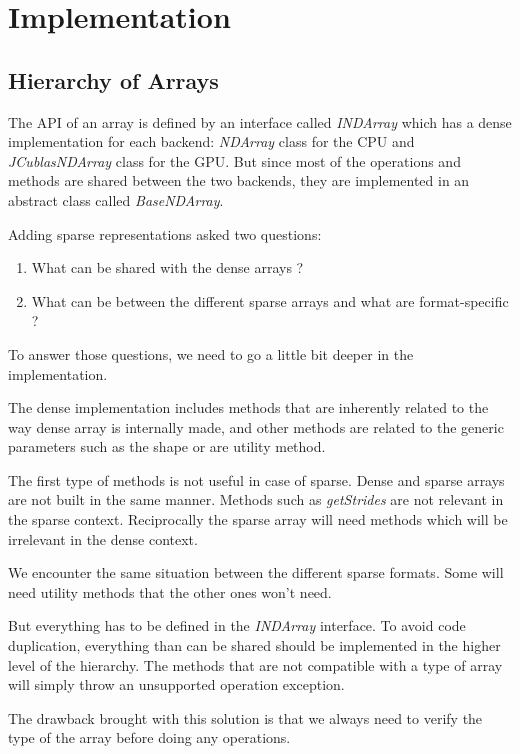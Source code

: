 \chapter{Implementation}


\section{Hierarchy of Arrays}

The API of an array is defined by an interface called \textit{INDArray} which has a dense implementation for each backend: \textit{NDArray} class for the CPU and \textit{JCublasNDArray} class for the GPU. But since most of the operations and methods are shared between the two backends, they are implemented in an abstract class called \textit{BaseNDArray}.

Adding sparse representations asked two questions:
\begin{enumerate}
 	\item What can be shared with the dense arrays ?
	\item What can be between the different sparse arrays and what are format-specific ?
\end{enumerate}

To answer those questions, we need to go a little bit deeper in the implementation. 

The dense implementation includes methods that are inherently related to the way dense array is internally made, and other methods are related to the generic parameters such as the shape or are utility method.

The first type of methods is not useful in case of sparse. Dense and sparse arrays are not built in the same manner. Methods such as \textit{getStrides} are not relevant in the sparse context. Reciprocally the sparse array will need methods which will be irrelevant in the dense context.

We encounter the same situation between the different sparse formats. Some will need utility methods that the other ones won't need.

But everything has to be defined in the \textit{INDArray} interface. To avoid code duplication, everything than can be shared should be implemented in the higher level of the hierarchy. The methods that are not compatible with a type of array will simply throw an unsupported operation exception.

The drawback brought with this solution is that we always need to verify the type of the array before doing any operations.

